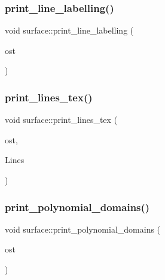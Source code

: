 \mbox{\label{classsurface_afeef78615e64039d71631765309d518e}} 
\subsubsection{\texorpdfstring{print\+\_\+line\+\_\+labelling()}{print\_line\_labelling()}}
{\footnotesize\ttfamily void surface\+::print\+\_\+line\+\_\+labelling (\begin{DoxyParamCaption}\item[{ostream \&}]{ost }\end{DoxyParamCaption})}

\mbox{\label{classsurface_a88812cb4944301429541a3328ba11ac6}} 
\subsubsection{\texorpdfstring{print\+\_\+lines\+\_\+tex()}{print\_lines\_tex()}}
{\footnotesize\ttfamily void surface\+::print\+\_\+lines\+\_\+tex (\begin{DoxyParamCaption}\item[{ostream \&}]{ost,  }\item[{\mbox{\hyperlink{galois_8h_a09fddde158a3a20bd2dcadb609de11dc}{I\+NT}} $\ast$}]{Lines }\end{DoxyParamCaption})}

\mbox{\label{classsurface_a4be62ffec9d7c0445f2a6bebfaa4f585}} 
\subsubsection{\texorpdfstring{print\+\_\+polynomial\+\_\+domains()}{print\_polynomial\_domains()}}
{\footnotesize\ttfamily void surface\+::print\+\_\+polynomial\+\_\+domains (\begin{DoxyParamCaption}\item[{ostream \&}]{ost }\end{DoxyParamCaption})}

